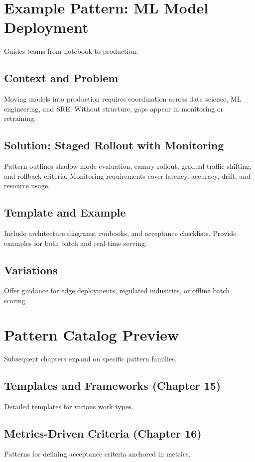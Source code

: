 \section{Example Pattern: ML Model Deployment}
\label{sec:example-ml-deployment}

Guides teams from notebook to production.

\subsection{Context and Problem}
Moving models into production requires coordination across data science, ML engineering, and SRE. Without structure, gaps appear in monitoring or retraining.

\subsection{Solution: Staged Rollout with Monitoring}
Pattern outlines shadow mode evaluation, canary rollout, gradual traffic shifting, and rollback criteria. Monitoring requirements cover latency, accuracy, drift, and resource usage.

\subsection{Template and Example}
Include architecture diagrams, runbooks, and acceptance checklists. Provide examples for both batch and real-time serving.

\subsection{Variations}
Offer guidance for edge deployments, regulated industries, or offline batch scoring.

\section{Pattern Catalog Preview}
\label{sec:catalog-preview}

Subsequent chapters expand on specific pattern families.

\subsection{Templates and Frameworks (Chapter 15)}
Detailed templates for various work types.

\subsection{Metrics-Driven Criteria (Chapter 16)}
Patterns for defining acceptance criteria anchored in metrics.

